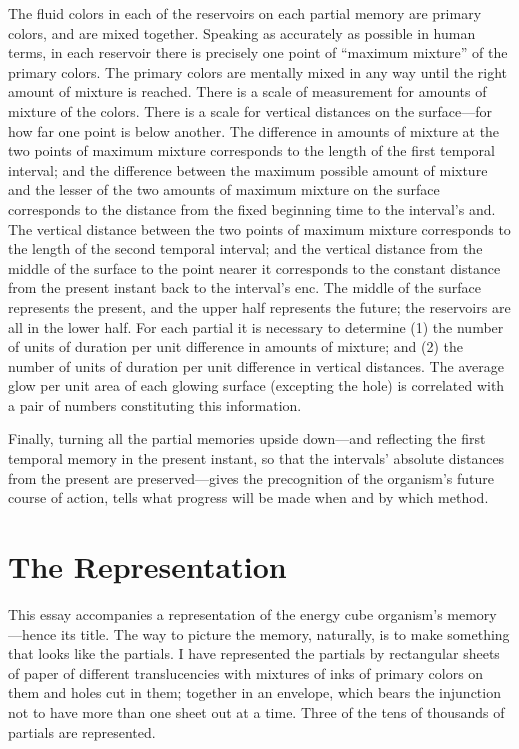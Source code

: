 The fluid colors in each of the reservoirs on each partial memory are 
primary colors, and are mixed together. Speaking as accurately as possible in 
human terms, in each reservoir there is precisely one point of \enquote{maximum 
mixture} of the primary colors. The primary colors are mentally mixed in 
any way until the right amount of mixture is reached. There is a scale of 
measurement for amounts of mixture of the colors. There is a scale for 
vertical distances on the surface---for how far one point is below another. The 
difference in amounts of mixture at the two points of maximum mixture 
corresponds to the length of the first temporal interval; and the difference 
between the maximum possible amount of mixture and the lesser of the two 
amounts of maximum mixture on the surface corresponds to the distance 
from the fixed beginning time to the interval's and. The vertical distance 
between the two points of maximum mixture corresponds to the length of 
the second temporal interval; and the vertical distance from the middle of 
the surface to the point nearer it corresponds to the constant distance from 
the present instant back to the interval's enc. The middle of the surface 
represents the present, and the upper half represents the future; the 
reservoirs are all in the lower half. For each partial it is necessary to 
determine (1) the number of units of duration per unit difference in 
amounts of mixture; and (2) the number of units of duration per unit 
difference in vertical distances. The average glow per unit area of each 
glowing surface (excepting the hole) is correlated with a pair of numbers 
constituting this information. 

Finally, turning all the partial memories upside down---and reflecting the 
first temporal memory in the present instant, so that the intervals' absolute 
distances from the present are preserved---gives the precognition of the 
organism's future course of action, tells what progress will be made when 
and by which method. 


\section*{The Representation}

This essay accompanies a representation of the energy cube organism's 
memory ---hence its title. The way to picture the memory, naturally, is to 
make something that looks like the partials. I have represented the partials 
by rectangular sheets of paper of different translucencies with mixtures of 
inks of primary colors on them and holes cut in them; together in an 
envelope, which bears the injunction not to have more than one sheet out at 
a time. Three of the tens of thousands of partials are represented. 
